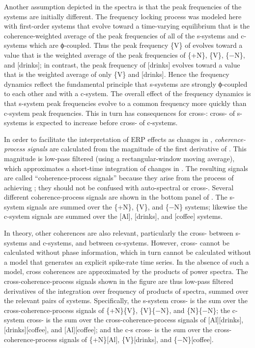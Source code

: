 Another assumption depicted in the spectra is that the peak frequencies of the systems are initially different. The frequency locking process was modeled here with first-order systems that evolve toward a time-varying equilibrium that is the coherence-weighted average of the peak frequencies of all of the s-sys\-tems and c-sys\-tems which are ϕ-coupled. Thus the peak frequency \{V\} of evolves toward a value that is the weighted average of the peak frequencies of \{+N\}, \{V\}, \{−N\}, and [drinks]; in contrast, the peak frequency of [drinks] evolves toward a value that is the weighted average of only \{V\} and [drinks]. Hence the frequency dynamics reflect the fundamental principle that s-sys\-tems are strongly ϕ-coupled to each other and  with a c-sys\-tem. The overall effect of the frequency dynamics is that s-sys\-tem peak frequencies evolve to a common frequency more quickly than c-sys\-tem peak frequencies. This in turn has consequences for cross-: cross- of s-sys\-tems is expected to increase before cross- of c-sys\-tems.

  In order to facilitate the interpretation of ERP effects as changes in , \textit{coherence-process signals} are calculated from the magnitude of the first derivative of . This magnitude is low-pass filtered (using a rectangular-window moving average), which approximates a short-time integration of changes in . The resulting signals are called “coherence-process signals” because they arise from the process of achieving ; they should not be confused with auto-spectral or cross-. Several different coherence-process signals are shown in the bottom panel of {}. The s-sys\-tem  signals are summed over the \{+N\}, \{V\}, and \{−N\} systems; likewise the c-sys\-tem signals are summed over the [Al], [drinks], and [coffee] systems. 
  
  In theory, other coherences are also relevant, particularly the cross- between s-sys\-tems and c-sys\-tems, and between cs-sys\-tems. However, cross- cannot be calculated without phase information, which in turn cannot be calculated without a model that generates an explicit spike-rate time series. In the absence of such a model, cross coherences are approximated by the products of power spectra. The cross-coherence-process signals shown in the figure are thus low-pass filtered derivatives of the integration over frequency of products of spectra, summed over the relevant pairs of systems. Specifically, the s-sys\-tem cross- is the sum over the cross-coherence-process signals of \{+N\}\{V\}, \{V\}\{−N\}, and \{N\}\{−N\}; the c-sys\-tem cross- is the sum over the cross-coherence-process signals of [Al][drinks], [drinks][coffee], and [Al][coffee]; and the c-s cross- is the sum over the cross-coherence-process signals of \{+N\}[Al], \{V\}[drinks], and \{−N\}[coffee]. 

